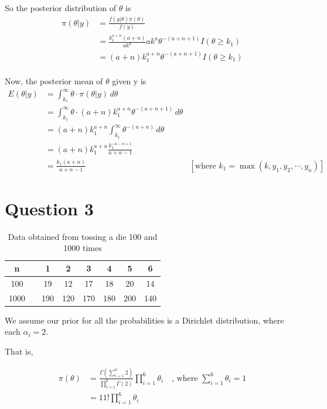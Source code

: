 \documentclass[a4paper]{article}
\begin{document}
So the posterior distribution of \(\theta\) is 
\begin{align*}
    \pi(\theta|y) &= \frac{f(y|\theta)\pi(\theta)}{f(y)}\\ 
    &= \frac{k_1^{a+n}(a+n)}{ak^a} ak^a\theta^{-(a+n+1)} I(\theta \geq k_1)\\
    &= (a+n) k_1^{a+n} \theta^{-(a+n+1)} I(\theta \geq k_1)\\
\end{align*}

Now, the posterior mean of \(\theta\) given y is 
\begin{align*}
    E(\theta|y) &= \int_{k_1}^{\infty} \theta \cdot \pi(\theta|y) \,d\theta \\
    &= \int_{k_1}^{\infty} \theta \cdot (a+n) k_1^{a+n} \theta^{-(a+n+1)}\,d\theta \\
    &= (a+n)k_1^{a+n} \int_{k_1}^{\infty} \theta^{-(a+n)}\, d\theta\\
    &= (a+n)k_1^{a+n} \frac{k_1^{-a-n+1}}{a+n-1} \\
    &= \frac{k_1(a+n)}{a+n-1} & [\text{where \(k_1 = \max(k,y_1,y_2,\cdots,y_n)\)}]
\end{align*}


\newpage

\section*{Question 3}

\begin{table}[ht]
    \centering
    \begin{tabular}{@{}cccccccc@{}}
        \toprule
        n & &1 & 2 & 3 & 4 & 5 & 6\\
        \midrule
        100 & &19 & 12 & 17 & 18 & 20 & 14\\
        1000 & &190 & 120 & 170 & 180 & 200 & 140\\
        \bottomrule
    \end{tabular}
    \caption{Data obtained from tossing a die 100 and 1000 times}
\end{table}

We assume our prior for all the probabilities is a Dirichlet distribution, where each \(\alpha_i = 2\). 

That is,

\begin{align*}
    \pi(\theta) &= \frac{\Gamma(\sum_{i=1}^{6} 2)}{\prod_{i=1}^{6} \Gamma(2)} \prod_{i=1}^{6} \theta_i \quad \text{, where \(\sum_{i=1}^{6} \theta_i = 1\)} \\
    &= 11! \prod_{i=1}^{6} \theta_i
\end{align*}
\end{document}
